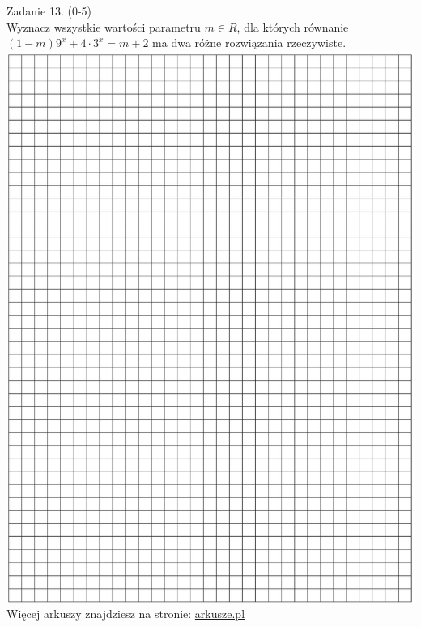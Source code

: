\documentclass[10pt]{article}
\begin{document}
Zadanie 13. (0-5)\\
Wyznacz wszystkie wartości parametru \(m \in R\), dla których równanie \((1-m) 9^{x}+4 \cdot 3^{x}=m+2\) ma dwa różne rozwiązania rzeczywiste.\\
\includegraphics[max width=\textwidth, center]{2024_11_21_5abc0108fbbc287103ecg-12}\\
Więcej arkuszy znajdziesz na stronie: \href{http://arkusze.pl}{arkusze.pl}\\
\end{document}

